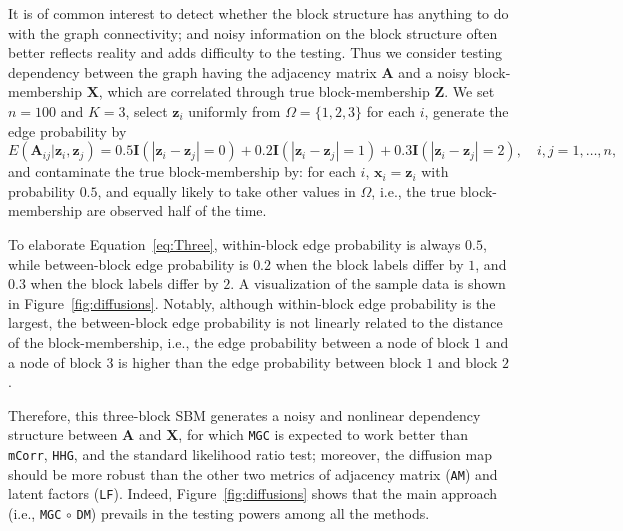 \documentclass[12pt]{article}
\theoremstyle{definition}
\begin{document}
	It is of common interest to detect whether the block structure has anything to do with the graph connectivity; and noisy information on the block structure often better reflects reality and adds difficulty to the testing. Thus we consider testing dependency between the graph having the adjacency matrix $\mathbf{A}$ and a noisy block-membership $\mathbf{X}$, which are correlated through true block-membership $\mathbf{Z}$. We set $n=100$ and $K=3$, select $\mathbf{z}_i$ uniformly from $\Omega=\{1,2,3\}$ for each $i$, generate the edge probability by
	\begin{equation}
	\label{eq:Three}
	E(\mathbf{A}_{ij} | \mathbf{z}_{i}, \mathbf{z}_{j}) = 0.5 \mathbf{I}(|\mathbf{z}_{i} - \mathbf{z}_{j}| = 0) + 0.2 \mathbf{I}(|\mathbf{z}_{i} - \mathbf{z}_{j}| = 1) + 0.3 \mathbf{I}(|\mathbf{z}_{i} - \mathbf{z}_{j}| = 2), \quad i,j = 1, \ldots, n,
	\end{equation} 
	and contaminate the true block-membership by: for each $i$, $\mathbf{x}_{i}=\mathbf{z}_{i}$ with probability $0.5$, and equally likely to take other values in $\Omega$, i.e., the true block-membership are observed half of the time.
	
	To elaborate Equation~\ref{eq:Three}, within-block edge probability is always $0.5$, while between-block edge probability is $0.2$ when the block labels differ by $1$, and $0.3$ when the block labels differ by $2$. A visualization of the sample data is shown in Figure~\ref{fig:diffusions}. 
	Notably, although within-block edge probability is the largest, the between-block edge probability is not linearly related to the distance of the block-membership, i.e., the edge probability between a node of block $1$ and a node of block $3$ is higher than the edge probability between block $1$ and block $2$. 
	
	Therefore, this three-block SBM generates a noisy and nonlinear dependency structure between $\mathbf{A}$ and $\mathbf{X}$, for which \texttt{MGC} is expected to work better than \texttt{mCorr}, \texttt{HHG}, and the standard likelihood ratio test; moreover, the diffusion map should be more robust than the other two metrics of adjacency matrix (\texttt{AM}) and latent factors (\texttt{LF}). Indeed, Figure~\ref{fig:diffusions} shows that the main approach (i.e., \texttt{MGC} $\circ$ \texttt{DM}) prevails in the testing powers among all the methods.
	
\end{document}
